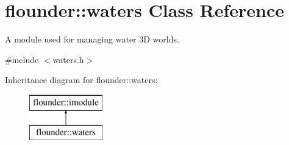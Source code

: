 \hypertarget{classflounder_1_1waters}{}\section{flounder\+:\+:waters Class Reference}
\label{classflounder_1_1waters}


A module used for managing water 3D worlds.  




{\ttfamily \#include $<$waters.\+h$>$}

Inheritance diagram for flounder\+:\+:waters\+:\begin{figure}[H]
\begin{center}
\leavevmode
\includegraphics[height=2.000000cm]{classflounder_1_1waters}
\end{center}
\end{figure}
